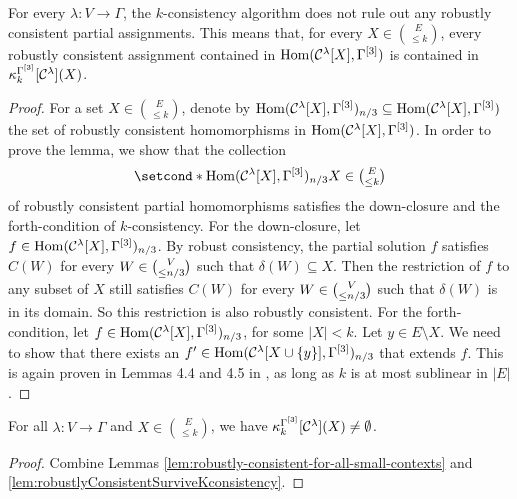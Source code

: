 \documentclass[a4paper,english, thm-restate]{lipics-v2021}
\newcommand{\kcol}[3]{\kappa_{#1}^{#2}[#3]}
\newcommand{\Hom}[2]{\mathrm{Hom}(#1,#2)}
\newcommand{\CosetGrpTmplt}[2]{#1^{[#2]}}
\begin{document}
	\begin{lemma}
		\label{lem:robustlyConsistentSurviveKconsistency}
		For every $\lambda \colon V \to \Gamma$,
		the $k$-consistency algorithm does not rule out any robustly consistent partial assignments.
		This means that, for every $X \in \binom{E}{\leq k}$,  every robustly consistent assignment
		contained in $\Hom{\grpCSPf{H}{\Gamma}{\lambda}[X]}{\CosetGrpTmplt{\Gamma}{3}}$
		is contained in $\kcol{k}{\CosetGrpTmplt{\Gamma}{3}}{\grpCSPf{H}{\Gamma}{\lambda}} (X)$.
	\end{lemma}
	\begin{proof}
		For a set $X \in \binom{E}{\leq k}$, 
		denote by $\Hom{\grpCSPf{H}{\Gamma}{\lambda}[X]}{\CosetGrpTmplt{\Gamma}{3}}_{n/3} \subseteq \Hom{\grpCSPf{H}{\Gamma}{\lambda}[X]}{\CosetGrpTmplt{\Gamma}{3}}$ 
		the set of robustly consistent homomorphisms in $\Hom{\grpCSPf{H}{\Gamma}{\lambda}[X]}{\CosetGrpTmplt{\Gamma}{3}}$. 
		In order to prove the lemma, we show that the collection 
		\[\setcond*{\Hom{\grpCSPf{H}{\Gamma}{\lambda}[X]}{\CosetGrpTmplt{\Gamma}{3}}_{n/3} }{ X \in \tbinom{E}{\leq k} }\]
		of robustly consistent partial homomorphisms satisfies the down-closure and the forth-condition of $k$-consistency.
		For the down-closure, let $f \in \Hom{\grpCSPf{H}{\Gamma}{\lambda}[X]}{\CosetGrpTmplt{\Gamma}{3}}_{n/3}$.
		By robust consistency,
		the partial solution $f$ satisfies $C(W)$ for every $W \in \tbinom{V}{\leq n/3}$ such that $\delta(W) \subseteq X$.
		Then the restriction of $f$ to any subset of $X$ still satisfies $C(W)$ for every $W \in \tbinom{V}{\leq n/3}$ such that $\delta(W)$ is in its domain. So this restriction is also robustly consistent. For the forth-condition, let $f \in \Hom{\grpCSPf{H}{\Gamma}{\lambda}[X]}{\CosetGrpTmplt{\Gamma}{3}}_{n/3}$, for some $|X| < k$. Let $y \in E \setminus X$. We need to show that there exists an $f' \in  \Hom{\grpCSPf{H}{\Gamma}{\lambda}[X \cup \{y\}]}{\CosetGrpTmplt{\Gamma}{3}}_{n/3}$ that extends $f$.
		This is again proven in Lemmas 4.4 and 4.5 in \cite{BerkholzGrohe2017}, as long as $k$ is at most sublinear in $|E|$.
	\end{proof}
	
	
	\begin{corollary}
		\label{cor:kConsistencyFails}
		For all $\lambda \colon V \to \Gamma$ and $X \in \binom{E}{\leq k}$,
		we have $\kcol{k}{\CosetGrpTmplt{\Gamma}{3}}{\grpCSPf{H}{\Gamma}{\lambda}}(X) \neq \emptyset$.
	\end{corollary}	
	\begin{proof}
		Combine Lemmas \ref{lem:robustly-consistent-for-all-small-contexts} and \ref{lem:robustlyConsistentSurviveKconsistency}.
	\end{proof}	
	
\end{document}
